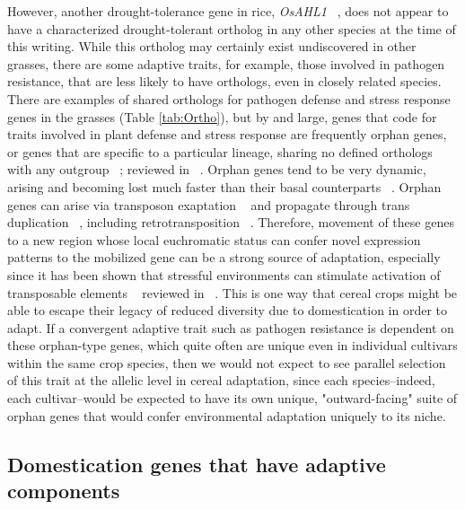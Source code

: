 \documentclass[12pt]{article}
\begin{document}
However, another drought-tolerance gene in rice, \textit{OsAHL1} ~\citep{Zhou2016}, does not appear to have a characterized drought-tolerant ortholog in any other species at the time of this writing.
While this ortholog may certainly exist undiscovered in other grasses, there are some adaptive traits, for example, those involved in pathogen resistance, that are less likely to have orthologs, even in closely related species.
There are examples of shared orthologs for pathogen defense and stress response genes in the grasses (Table \ref{tab:Ortho}), but by and large, genes that code for traits involved in plant defense and stress response are frequently orphan genes, or genes that are specific to a particular lineage, sharing no defined orthologs with any outgroup ~\citep{Woodhouse2011}; reviewed in ~\citep{Arendsee2014}.
Orphan genes tend to be very dynamic, arising and becoming lost much faster than their basal counterparts ~\citep{Freeling2008}.
Orphan genes can arise via transposon exaptation ~\citep{Donoghue2011} and propagate through trans duplication ~\citep{Freeling2008, Arendsee2014}, including retrotransposition ~\citep{Wang2006}. 
Therefore, movement of these genes to a new region whose local euchromatic status can confer novel expression patterns to the mobilized gene can be a strong source of adaptation, especially since it has been shown that stressful environments can stimulate activation of transposable elements ~\citep{Beguiristain2001, Makarevitch2015}  reviewed in ~\citep{Negi2016}. 
This is one way that cereal crops might be able to escape their legacy of reduced diversity due to domestication in order to adapt. 
If a convergent adaptive trait such as pathogen resistance is dependent on these orphan-type genes, which quite often are unique even in individual cultivars within the same crop species, then we would not expect to see parallel selection of this trait at the allelic level in cereal adaptation, since each species--indeed, each cultivar--would be expected to have its own unique, "outward-facing" suite of orphan genes that would confer environmental adaptation uniquely to its niche.

\subsection*{Domestication genes that have adaptive components}
\end{document}
